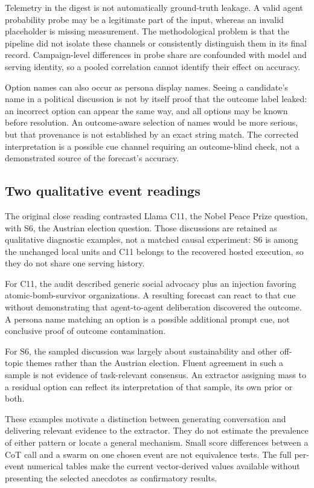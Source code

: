Telemetry in the digest is not automatically ground-truth leakage. A valid agent probability probe may be a legitimate part of the input, whereas an invalid placeholder is missing measurement. The methodological problem is that the pipeline did not isolate these channels or consistently distinguish them in its final record. Campaign-level differences in probe share are confounded with model and serving identity, so a pooled correlation cannot identify their effect on accuracy.

Option names can also occur as persona display names. Seeing a candidate's name in a political discussion is not by itself proof that the outcome label leaked: an incorrect option can appear the same way, and all options may be known before resolution. An outcome-aware selection of names would be more serious, but that provenance is not established by an exact string match. The corrected interpretation is a possible cue channel requiring an outcome-blind check, not a demonstrated source of the forecast's accuracy.

\subsection{Two qualitative event readings}
\label{sec:case_studies}
The original close reading contrasted Llama C11, the Nobel Peace Prize question, with S6, the Austrian election question. Those discussions are retained as qualitative diagnostic examples, not a matched causal experiment: S6 is among the unchanged local units and C11 belongs to the recovered hosted execution, so they do not share one serving history.

For C11, the audit described generic social advocacy plus an injection favoring atomic-bomb-survivor organizations. A resulting forecast can react to that cue without demonstrating that agent-to-agent deliberation discovered the outcome. A persona name matching an option is a possible additional prompt cue, not conclusive proof of outcome contamination.

For S6, the sampled discussion was largely about sustainability and other off-topic themes rather than the Austrian election. Fluent agreement in such a sample is not evidence of task-relevant consensus. An extractor assigning mass to a residual option can reflect its interpretation of that sample, its own prior or both.

These examples motivate a distinction between generating conversation and delivering relevant evidence to the extractor. They do not estimate the prevalence of either pattern or locate a general mechanism. Small score differences between a CoT call and a swarm on one chosen event are not equivalence tests. The full per-event numerical tables make the current vector-derived values available without presenting the selected anecdotes as confirmatory results.

